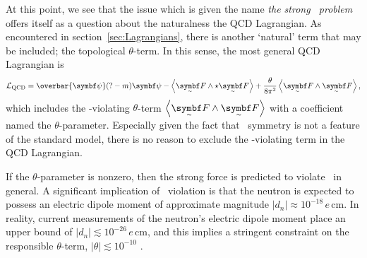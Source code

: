 At this point, we see that the issue which is given the name \emph{the strong \CP\ problem} offers itself as a question about the naturalness the QCD Lagrangian.
As encountered in section~\ref{sec:Lagrangians}, there is another `natural' term that may be included; the topological $\theta$-term.
In this sense, the most general QCD Lagrangian is
\begin{align}
	\cal L_\text{QCD} = \overbar{\bm\psi}\qty(? - m)\bm\psi
	- \ang{\tsbm F \wedge\star \tsbm F}
	+ \frac{\theta}{8\pi^2}\ang{\tsbm F \wedge \tsbm F}
,\end{align}
which includes the \CP-violating $\theta$-term $\ang{\tsbm F\wedge\tsbm F}$ with a coefficient named the $\theta$-parameter.
Especially given the fact that \CP\ symmetry is not a feature of the standard model, there is no reason to exclude the \CP-violating term in the QCD Lagrangian.


If the $\theta$-parameter is nonzero, then the strong force is predicted to violate \CP\ in general.
A significant implication of \CP\ violation is that the neutron is expected to possess an electric dipole moment of approximate magnitude $|d_n| \approx 10^{-18} \,e\,\mathrm{cm}$.
In reality, current measurements \cite{electric_dipole_neutron_2020} of the neutron's electric dipole moment place an upper bound of $|d_n| \lesssim 10^{-26} \,e\,\mathrm{cm}$, and this implies a stringent constraint on the responsible $\theta$-term, $|\theta| \lesssim 10^{-10}$ \cite{Review_2018}.

